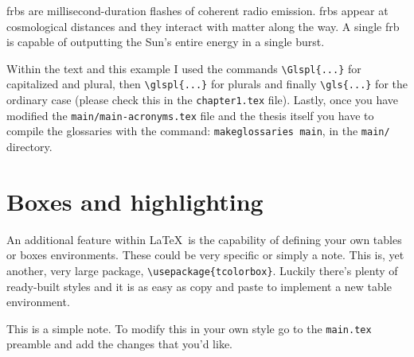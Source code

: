 \Glspl{frb} are millisecond-duration flashes of coherent radio emission. \glspl{frb} appear at cosmological distances and they interact with matter along the way. A single \gls{frb} is capable of outputting the Sun's entire energy in a single burst.

Within the text and this example I used the commands \verb|\Glspl{...}| for capitalized and plural, then \verb|\glspl{...}| for plurals and finally \verb|\gls{...}| for the ordinary case (please check this in the \texttt{chapter1.tex} file).
Lastly, once you have modified the \texttt{main/main-acronyms.tex} file and the thesis itself you have to compile the glossaries with the command: \texttt{makeglossaries main}, in the \texttt{main/} directory.


\section{Boxes and highlighting}
\label{sec:boxes}

An additional feature within \LaTeX\ is the capability of defining your own tables or boxes environments. These could be very specific or simply a note. This is, yet another, very large package, \verb|\usepackage{tcolorbox}|. Luckily there's plenty of ready-built styles and it is as easy as copy and paste to implement a new table environment.

\begin{note}
  This is a simple note. To modify this in your own style go to the \texttt{main.tex} preamble and add the changes that you'd like.
\end{note}